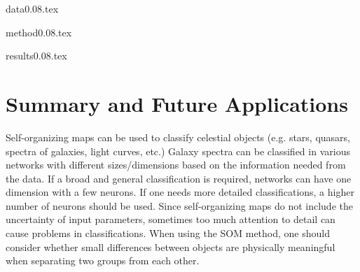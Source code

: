 \documentclass[useAMS,usenatbib]{mn2e}
\begin{document}
{data0.08.tex}


{method0.08.tex}

{results0.08.tex}
\section{Summary and Future Applications}
\label{sec: summary_SOMZ}

    Self-organizing maps can be used to classify celestial objects (e.g. stars, quasars, spectra of galaxies, light curves, etc.)
    Galaxy spectra can be classified in various networks with different sizes/dimensions based on the information needed from the data. 
    If a broad and general classification is required, networks can have one dimension with a few neurons. 
    If one needs more detailed classifications, a higher number of neurons should be used.
    Since self-organizing maps do not include the uncertainty of input parameters, sometimes too much attention to detail can cause problems in classifications. 
    When using the SOM method, one should consider whether small differences between objects are physically meaningful when separating two groups from each other.
\end{document}
